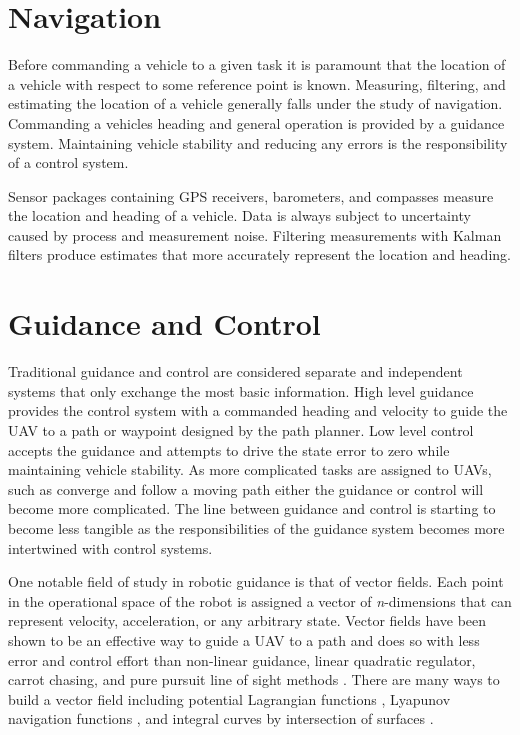 \documentclass[numbered,pdftex]{ohio-etd}
\begin{document}
\section{Navigation}
Before commanding a vehicle to a given task it is paramount that the location of a vehicle with respect to some reference point is known. Measuring, filtering, and estimating the location of a vehicle generally falls under the study of navigation. Commanding a vehicles heading and general operation is provided by a guidance system. Maintaining vehicle stability and reducing any errors is the responsibility of a control system. 

Sensor packages containing GPS receivers, barometers, and compasses measure the location and heading of a vehicle. Data is always subject to uncertainty caused by process and measurement noise. Filtering measurements with Kalman filters produce estimates that more accurately represent the location and heading.



\section{Guidance and Control}
Traditional guidance and control are considered separate and independent systems that only exchange the most basic information. High level guidance provides the control system with a commanded heading and velocity to guide the UAV to a path or waypoint designed by the path planner. Low level control accepts the guidance and attempts to drive the state error to zero while maintaining vehicle stability. As more complicated tasks are assigned to UAVs, such as converge and follow a moving path \cite{oliveira_moving_2016} either the guidance or control will become more complicated. The line between guidance and control is starting to become less tangible as the responsibilities of the guidance system becomes more intertwined with control systems. 

One notable field of study in robotic guidance is that of vector fields. Each point in the operational space of the robot is assigned a vector of \textit{n}-dimensions that can represent velocity, acceleration, or any arbitrary state. Vector fields have been shown to be an effective way to guide a UAV to a path and does so with less error and control effort than non-linear guidance, linear quadratic regulator, carrot chasing, and pure pursuit line of sight methods \cite{sujit_unmanned_2014}. There are many ways to build a vector field including potential Lagrangian functions \cite{khatib_real-time_1986}, Lyapunov navigation functions \cite{esposito_method_2002}\cite{frew_lyapunov_nodate} \cite{nelson_cooperative_2005}, and integral curves by intersection of surfaces \cite{goncalves_artificial_2009} \cite{goncalves_vector_2010}.
\end{document}

